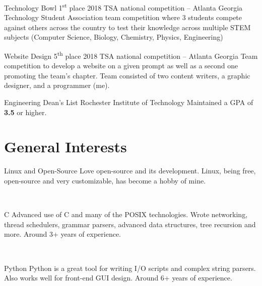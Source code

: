 \documentclass[]{alternate}          %
\begin{document}
\begin{entrylist}
\entry
{}
{Technology Bowl 1\textsuperscript{st} place}
{2018 TSA national competition -- Atlanta Georgia}
{Technology Student Association team competition where 3 students compete against others across the country to test their knowledge across multiple STEM subjects (Computer Science, Biology, Chemistry, Physics, Engineering)}

\end{entrylist}
\begin{entrylist}

\entry
{}
{Website Design 5\textsuperscript{th} place}
{2018 TSA national competition -- Atlanta Georgia}
{Team competition to develop a website on a given prompt as well as a second one promoting the team's chapter. Team consisted of two content writers, a graphic designer, and a programmer (me).}


\end{entrylist}
\begin{entrylist}

\entry
{}
{Engineering Dean's List}
{Rochester Institute of Technology}
{Maintained a GPA of \textbf{3.5} or higher.}

\end{entrylist}


\section{General Interests}
  \vspace{-0.3cm}
\begin{entrylist}
\entry
{}
{Linux and Open-Source}
{}
{Love open-source and its development. Linux, being free, open-source and very customizable, has become a hobby of mine. }

\end{entrylist}\
\begin{entrylist}
\entry
{}
{C}
{}
{Advanced use of C and many of the POSIX technologies. Wrote networking, thread schedulers, grammar parsers, advanced data structures, tree recursion and more. Around 3+ years of experience.}
\end{entrylist}\
\begin{entrylist}
\entry
{}
{Python}
{}
{Python is a great tool for writing I/O scripts and complex string parsers. Also works well for front-end GUI design. Around 6+ years of experience.}

\end{entrylist}\
\end{document}
